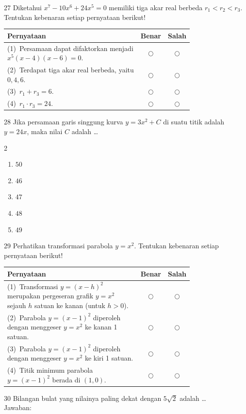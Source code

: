 \documentclass[11pt]{article}
\newenvironment{pilB}{%
  \par\smallskip\begin{multicols}{2}
  \begin{enumerate}[label=(\Alph*),leftmargin=*,itemsep=1pt,topsep=3pt]}%
  {\end{enumerate}\end{multicols}}
\begin{document}
\begin{soal}{27}
Diketahui $x^7-10x^6+24x^5=0$ memiliki tiga akar real berbeda
$r_1<r_2<r_3$.
Tentukan kebenaran setiap pernyataan berikut!

\par\smallskip
{\renewcommand{\arraystretch}{1.4}%
\begin{tabular}{@{}p{0.76\linewidth}cc@{}}
\hline
\textbf{Pernyataan} & \textbf{Benar} & \textbf{Salah}\\
\hline
(1)~Persamaan dapat difaktorkan menjadi $x^5(x-4)(x-6)=0$.
  & $\bigcirc$ & $\bigcirc$\\
(2)~Terdapat tiga akar real berbeda, yaitu $0,4,6$.
  & $\bigcirc$ & $\bigcirc$\\
(3)~$r_1+r_3 = 6$.
  & $\bigcirc$ & $\bigcirc$\\
(4)~$r_1\cdot r_3 = 24$.
  & $\bigcirc$ & $\bigcirc$\\
\hline
\end{tabular}}
\end{soal}

\begin{soal}{28}
Jika persamaan garis singgung kurva $y=3x^2+C$ di suatu titik
adalah $y=24x$, maka nilai $C$ adalah \ldots
\begin{pilB}
  \item $50$ \item $46$ \item $47$ \item $48$ \item $49$
\end{pilB}
\end{soal}

\begin{soal}{29}
Perhatikan transformasi parabola $y=x^2$.
Tentukan kebenaran setiap pernyataan berikut!

\par\smallskip
{\renewcommand{\arraystretch}{1.4}%
\begin{tabular}{@{}p{0.76\linewidth}cc@{}}
\hline
\textbf{Pernyataan} & \textbf{Benar} & \textbf{Salah}\\
\hline
(1)~Transformasi $y=(x-h)^2$ merupakan pergeseran grafik $y=x^2$
    sejauh $h$ satuan ke kanan (untuk $h>0$).
  & $\bigcirc$ & $\bigcirc$\\
(2)~Parabola $y=(x-1)^2$ diperoleh dengan menggeser $y=x^2$
    ke kanan 1 satuan.
  & $\bigcirc$ & $\bigcirc$\\
(3)~Parabola $y=(x-1)^2$ diperoleh dengan menggeser $y=x^2$
    ke kiri 1 satuan.
  & $\bigcirc$ & $\bigcirc$\\
(4)~Titik minimum parabola $y=(x-1)^2$ berada di $(1,0)$.
  & $\bigcirc$ & $\bigcirc$\\
\hline
\end{tabular}}
\end{soal}

\begin{soal}{30}
Bilangan bulat yang nilainya paling dekat dengan $5\sqrt{2}$ adalah \ldots\\[0.4em]
Jawaban:\enspace\underline{\hspace{4cm}}
\end{soal}
\end{document}
